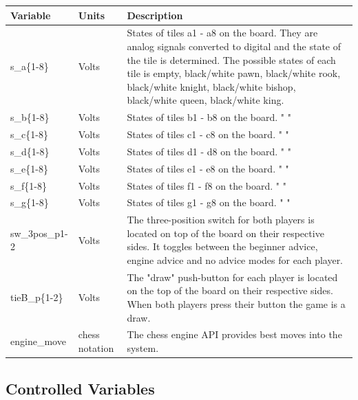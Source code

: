 \documentclass[12pt]{article}
\begin{document}
{\begin{table}[H]
  \centering
      \setlength{\leftmargini}{0.4cm}
      \begin{tabular}{| >{\centering\arraybackslash}m{2.5cm} | 
        >{\centering\arraybackslash}m{2cm} | 
        >{\centering\arraybackslash}m{9cm} |}
      \hline
      \rowcolor[gray]{0.9}
      Variable & Units & Description\\
      \hline
      s\_a\{1-8\} & Volts & States of tiles a1 - a8 on the board. They are analog signals 
      converted to digital and the state of the tile is determined. The possible states of 
      each tile is empty, black/white pawn, black/white rook, black/white knight, 
      black/white bishop, black/white queen, black/white king. \\
      \hline
      s\_b\{1-8\} & Volts & States of tiles b1 - b8 on the board. " " \\
      \hline
      s\_c\{1-8\} & Volts & States of tiles c1 - c8 on the board. " " \\
      \hline
      s\_d\{1-8\} & Volts & States of tiles d1 - d8 on the board. " " \\
      \hline
      s\_e\{1-8\} & Volts & States of tiles e1 - e8 on the board. " " \\
      \hline
      s\_f\{1-8\} & Volts & States of tiles f1 - f8 on the board. " " \\
      \hline
      s\_g\{1-8\} & Volts & States of tiles g1 - g8 on the board. " " \\
      \hline
      sw\_3pos\_p{1-2} & Volts & The three-position switch for both players is located
      on top of the board on their respective sides. It toggles between the beginner 
      advice, engine advice and no advice modes for each player.\\
      \hline
      tieB\_p\{1-2\} & Volts & The "draw" push-button for each player is located on 
      the top of the board on their respective sides. When both players press their button
      the game is a draw. \\
      \hline
      engine\_move & chess notation & The chess engine API provides best moves into 
      the system. \\
      \hline 
      \end{tabular}
  \label{Table}
  \end{table}

\subsection{Controlled Variables}

}
\end{document}
